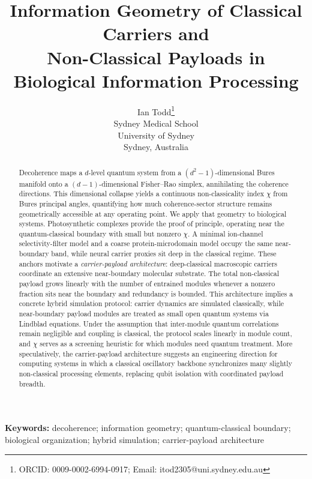 \documentclass[11pt,a4paper]{article}
\title{Information Geometry of Classical Carriers and\\ Non-Classical Payloads in Biological Information Processing}
\author{Ian Todd\thanks{ORCID: 0009-0002-6994-0917; Email: itod2305@uni.sydney.edu.au}\\
Sydney Medical School\\
University of Sydney\\
Sydney, Australia}
\date{}
\theoremstyle{definition}
\theoremstyle{remark}
\begin{document}
\maketitle

\begin{abstract}
Decoherence maps a $d$-level quantum system from a $(d^2-1)$-dimensional Bures manifold onto a $(d-1)$-dimensional Fisher--Rao simplex, annihilating the coherence directions. This dimensional collapse yields a continuous non-classicality index $\chi$ from Bures principal angles, quantifying how much coherence-sector structure remains geometrically accessible at any operating point. We apply that geometry to biological systems. Photosynthetic complexes provide the proof of principle, operating near the quantum-classical boundary with small but nonzero $\chi$. A minimal ion-channel selectivity-filter model and a coarse protein-microdomain model occupy the same near-boundary band, while neural carrier proxies sit deep in the classical regime. These anchors motivate a \emph{carrier-payload architecture}: deep-classical macroscopic carriers coordinate an extensive near-boundary molecular substrate. The total non-classical payload grows linearly with the number of entrained modules whenever a nonzero fraction sits near the boundary and redundancy is bounded. This architecture implies a concrete hybrid simulation protocol: carrier dynamics are simulated classically, while near-boundary payload modules are treated as small open quantum systems via Lindblad equations. Under the assumption that inter-module quantum correlations remain negligible and coupling is classical, the protocol scales linearly in module count, and $\chi$ serves as a screening heuristic for which modules need quantum treatment. More speculatively, the carrier-payload architecture suggests an engineering direction for computing systems in which a classical oscillatory backbone synchronizes many slightly non-classical processing elements, replacing qubit isolation with coordinated payload breadth.
\end{abstract}

\noindent\textbf{Keywords:} decoherence; information geometry; quantum-classical boundary; biological organization; hybrid simulation; carrier-payload architecture
\end{document}
